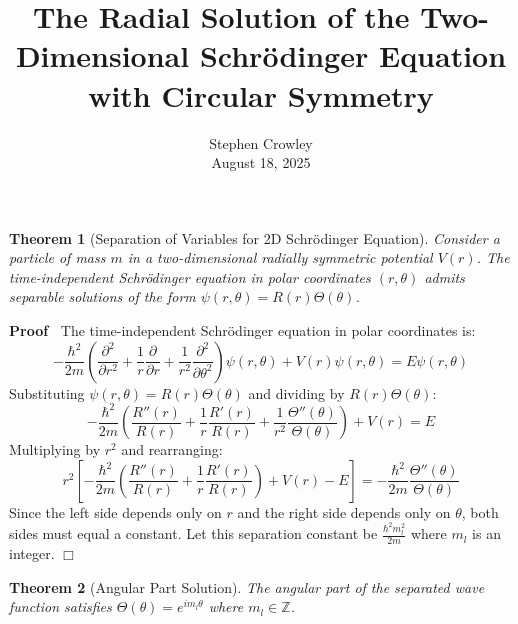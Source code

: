 \documentclass{article}
\newcommand{\tmaffiliation}[1]{\\ #1}
\newenvironment{proof}{\noindent\textbf{Proof\ }}{\hspace*{\fill}$\Box$\medskip}
\newtheorem{theorem}{Theorem}
\begin{document}
\title{The Radial Solution of the Two-Dimensional Schr{\"o}dinger Equation
with Circular Symmetry}

\author{
  Stephen Crowley
  \tmaffiliation{August 18, 2025}
}

\maketitle

\begin{theorem}
  [Separation of Variables for 2D Schr{\"o}dinger Equation] Consider a
  particle of mass $m$ in a two-dimensional radially symmetric potential $V
  (r)$. The time-independent Schr{\"o}dinger equation in polar coordinates
  $(r, \theta)$ admits separable solutions of the form $\psi (r, \theta) = R
  (r) \Theta (\theta)$.
\end{theorem}

\begin{proof}
  The time-independent Schr{\"o}dinger equation in polar coordinates is:
  \begin{equation}
    - \frac{\hbar^2}{2 m}  \left( \frac{\partial^2}{\partial r^2} +
    \frac{1}{r}  \frac{\partial}{\partial r} + \frac{1}{r^2} 
    \frac{\partial^2}{\partial \theta^2} \right) \psi (r, \theta) + V (r) \psi
    (r, \theta) = E \psi (r, \theta)
  \end{equation}
  Substituting $\psi (r, \theta) = R (r) \Theta (\theta)$ and dividing by $R
  (r) \Theta (\theta)$:
  \begin{equation}
    - \frac{\hbar^2}{2 m}  \left( \frac{R'' (r)}{R (r)} + \frac{1}{r} 
    \frac{R' (r)}{R (r)} + \frac{1}{r^2}  \frac{\Theta'' (\theta)}{\Theta
    (\theta)} \right) + V (r) = E
  \end{equation}
  Multiplying by $r^2$ and rearranging:
  \begin{equation}
    r^2  \left[ - \frac{\hbar^2}{2 m}  \left( \frac{R'' (r)}{R (r)} +
    \frac{1}{r}  \frac{R' (r)}{R (r)} \right) + V (r) - E \right] = -
    \frac{\hbar^2}{2 m}  \frac{\Theta'' (\theta)}{\Theta (\theta)}
  \end{equation}
  Since the left side depends only on $r$ and the right side depends only on
  $\theta$, both sides must equal a constant. Let this separation constant be
  $\frac{\hbar^2 m_l^2}{2 m}$ where $m_l$ is an integer.
\end{proof}

\begin{theorem}
  [Angular Part Solution] The angular part of the separated wave function
  satisfies $\Theta (\theta) = e^{im_l \theta}$ where $m_l \in \mathbb{Z}$.
\end{theorem}
\end{document}
